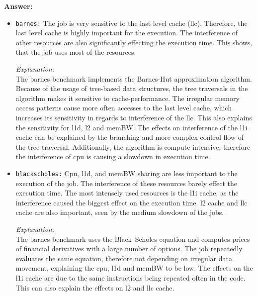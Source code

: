 \begin{enumerate}
\begin{enumerate}
        \textbf{Answer:}
        \begin{itemize}
            \item \texttt{barnes:} %
            The job is very sensitive to the last level cache (llc). Therefore, the last level cache is highly important for the execution. The interference of other resources are also significantly effecting the execution time. This shows, that the job uses most of the resources.
            
            \textit{Explanation:} %
            \\ The barnes benchmark implements the Barnes-Hut approximation algorithm. Because of the usage of tree-based data structures, the tree traversals in the algorithm makes it sensitive to cache-performance. The irregular memory access patterns cause more often accesses to the last level cache, which increases its sensitivity in regards to interference of the llc. This also explains the sensitivity for l1d, l2 and memBW. The effects on interference of the l1i cache can be explained by the branching and more complex control flow of the tree traversal. Additionally, the algorithm is compute intensive, therefore the interference of cpu is causing a slowdown in execution time.
            
            \item \texttt{blackscholes:} %
            Cpu, l1d, and memBW sharing are less important to the execution of the job. The interference of these resources barely effect the execution time. The most intensely used resources is the l1i cache, as the interference caused the biggest effect on the execution time. l2 cache and llc cache are also important, seen by the medium slowdown of the jobs.
            
            \textit{Explanation:} %
            \\ The barnes benchmark uses the Black–Scholes equation and computes prices of financial derivatives with a large number of options. The job repeatedly evaluates the same equation, therefore not depending on irregular data movement, explaining the cpu, l1d and memBW to be low. The effects on the l1i cache are due to the same instructions being repeated often in the code. This can also explain the effects on l2 and llc cache.


\end{itemize}
\end{enumerate}
\end{enumerate}
